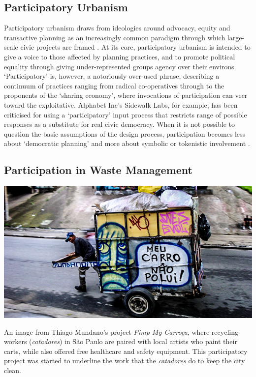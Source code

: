 \documentclass[nofonts,nols,justified,nobib]{tufte-book}
\begin{document}
\subsection*{Participatory Urbanism}
Participatory urbanism draws from ideologies around advocacy, equity and transactive planning as an increasingly common paradigm through which large-scale civic projects are framed \cite{krivy_participatory_2013}. At its core, participatory urbanism is intended to give a voice to those affected by planning practices, and to promote political equality through giving under-represented groups agency over their environs. `Participatory' is, however, a notoriously over-used phrase, describing a continuum of practices ranging from radical co-operatives through to the proponents of the `sharing economy', where invocations of participation can veer toward the exploitative. Alphabet Inc's Sidewalk Labs, for example, has been criticised for using a `participatory' input process that restricts range of possible responses as a substitute for real civic democracy. When it is not possible to question the basic assumptions of the design process, participation becomes less about `democratic planning' and more about symbolic or tokenistic involvement \cite{arnstein_ladder_1969}. 

\subsection*{Participation in Waste Management}

\begin{marginfigure}
\includegraphics[width=\textwidth]{img/1/catadores.jpg}
\caption{An image from Thiago Mundano's project \emph{Pimp My Carro\c{c}a}, where recycling workers (\emph{catadores}) in S\~{a}o Paulo are paired with local artists who paint their carts, while also offered free healthcare and safety equipment. This participatory project was started to underline the work that the \emph{catadores} do to keep the city clean. \cite{mundano_pimp_nodate} \label{b}}
\end{marginfigure}
\end{document}
